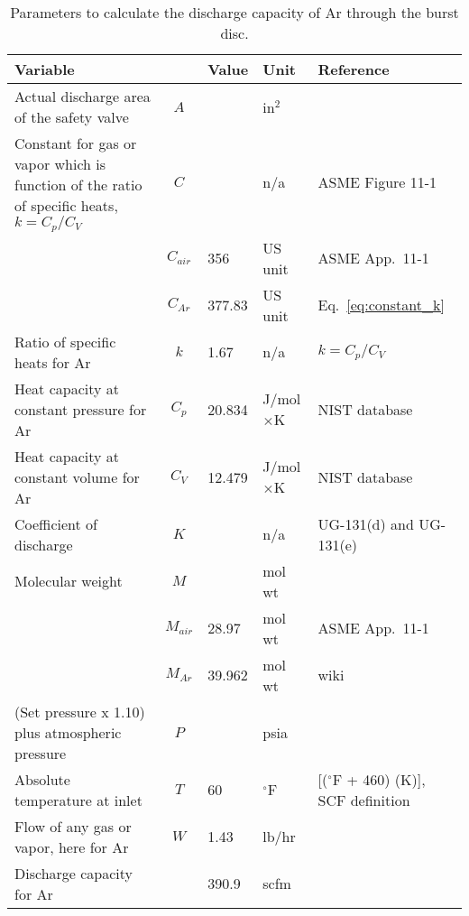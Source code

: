 \begin{table}[h]
\begin{center}
\tabcolsep=10pt
\begin{tabular}{>{\raggedleft}m{5cm}|c|l|l|m{5.5cm}}
\hline
\hline
Variable & & Value & Unit & Reference \\
\hline
Actual discharge area of the safety valve & $A$ & & in$^2$ & \\
Constant for gas or vapor which is function of the ratio of specific heats, 
$k = C_p/C_V$ & $C$ & & n/a & ASME Figure 11-1 \\
   & $C_{air}$ & 356 & US unit & ASME App.~11-1 \\
   & $C_{Ar}$ & 377.83 & US unit & Eq.~\ref{eq:constant_k} \\
Ratio of specific heats for Ar & $k$ & 1.67 & n/a & $k = C_p/C_V$ \\
Heat capacity at constant pressure for Ar & $C_p$ & 20.834 & J/mol$\times$K & NIST database \\
Heat capacity at constant volume for Ar & $C_V$ & 12.479 & J/mol$\times$K & NIST database \\
Coefficient of discharge & $K$ & & n/a & UG-131(d) and UG-131(e) \\
Molecular weight & $M$ & & mol wt &  \\
   & $M_{air}$ & 28.97 & mol wt & ASME App.~11-1 \\
   & $M_{Ar}$ & 39.962 & mol wt & wiki \\
(Set pressure x 1.10) plus atmospheric pressure & $P$ & & psia & \\
Absolute temperature at inlet & $T$ & 60 & $^{\circ}$F & [($^{\circ}$F + 460) (K)], 
SCF definition \\
\hline
Flow of any gas or vapor, here for Ar & $W$ & 1.43 & lb/hr &  \\ 
Discharge capacity for Ar & & 390.9 & scfm & \\
\hline
\hline
\end{tabular}
\caption{Parameters to calculate the discharge capacity of Ar through the burst disc.}
\label{table:discharge}
\end{center}
\end{table}
